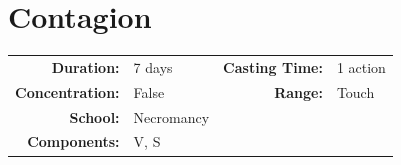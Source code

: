 \documentclass[12pt,showtrims]{memoir}
\begin{document}
\newpage
\section*{Contagion}

{
\small\centering\vspace{-6pt}
\begin{tabular}{rlrl}
\toprule

\textbf{Duration:} & 7 days &
\textbf{Casting Time:} & 1 action \\
\textbf{Concentration:} & False &
\textbf{Range:} & Touch \\
\textbf{School:} & Necromancy \\
\textbf{Components:} & \multicolumn{3}{p{0.7\textwidth}}{V, S}\\

\bottomrule
\end{tabular}
}
\end{document}
